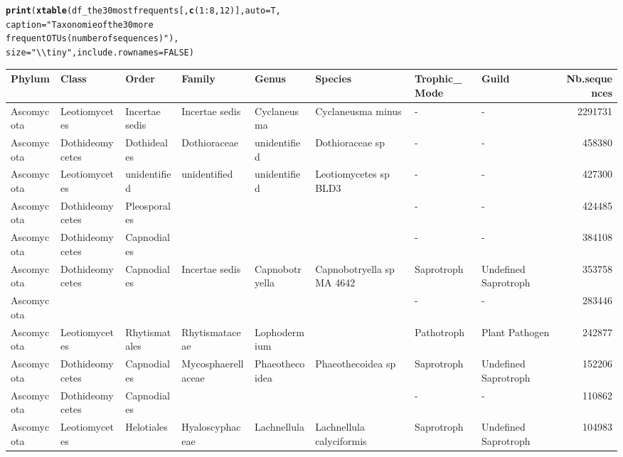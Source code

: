 \documentclass[12pt]{article}\usepackage[]{graphicx}\usepackage[]{color}
\makeatletter
\newcommand{\hlnum}[1]{\textcolor[rgb]{0.686,0.059,0.569}{#1}}%
\newcommand{\hlstr}[1]{\textcolor[rgb]{0.192,0.494,0.8}{#1}}%
\newcommand{\hlopt}[1]{\textcolor[rgb]{0,0,0}{#1}}%
\newcommand{\hlstd}[1]{\textcolor[rgb]{0.345,0.345,0.345}{#1}}%
\newcommand{\hlkwc}[1]{\textcolor[rgb]{0.333,0.667,0.333}{#1}}%
\newcommand{\hlkwd}[1]{\textcolor[rgb]{0.737,0.353,0.396}{\textbf{#1}}}%
\newenvironment{kframe}{%
 \def\at@end@of@kframe{}%
 \ifinner\ifhmode%
  \def\at@end@of@kframe{\end{minipage}}%
  \begin{minipage}{\columnwidth}%
 \fi\fi%
 \def\FrameCommand##1{\hskip\@totalleftmargin \hskip-\fboxsep
 \colorbox{shadecolor}{##1}\hskip-\fboxsep
     \hskip-\linewidth \hskip-\@totalleftmargin \hskip\columnwidth}%
 \MakeFramed {\advance\hsize-\width
   \@totalleftmargin\z@ \linewidth\hsize
   \@setminipage}}%
 {\par\unskip\endMakeFramed%
 \at@end@of@kframe}
\numberwithin{figure}{section}
\makeatother
\begin{document}
\begin{landscape}
\begin{kframe}
\begin{alltt}
\hlkwd{print}\hlstd{(}\hlkwd{xtable}\hlstd{(df_the30mostfrequents[,} \hlkwd{c}\hlstd{(}\hlnum{1}\hlopt{:}\hlnum{8}\hlstd{,} \hlnum{12}\hlstd{)],} \hlkwc{auto} \hlstd{= T,}
             \hlkwc{caption} \hlstd{=} \hlstr{"Taxonomie of the 30 more
             frequent OTUs (number of sequences)"}\hlstd{),}
      \hlkwc{size} \hlstd{=} \hlstr{"\textbackslash{}\textbackslash{}tiny"}\hlstd{,} \hlkwc{include.rownames} \hlstd{=} \hlnum{FALSE}\hlstd{)}
\end{alltt}
\end{kframe}%
\begin{table}[ht]
\centering
\begingroup\tiny
\begin{tabular}{llllllllr}
  \hline
Phylum & Class & Order & Family & Genus & Species & Trophic\_Mode & Guild & Nb.sequences \\ 
  \hline
Ascomycota & Leotiomycetes & Incertae sedis & Incertae sedis & Cyclaneusma & Cyclaneusma minus & - & - & 2291731 \\ 
  Ascomycota & Dothideomycetes & Dothideales & Dothioraceae & unidentified & Dothioraceae sp & - & - & 458380 \\ 
  Ascomycota & Leotiomycetes & unidentified & unidentified & unidentified & Leotiomycetes sp BLD3 & - & - & 427300 \\ 
  Ascomycota & Dothideomycetes & Pleosporales &  &  &  & - & - & 424485 \\ 
  Ascomycota & Dothideomycetes & Capnodiales &  &  &  & - & - & 384108 \\ 
  Ascomycota & Dothideomycetes & Capnodiales & Incertae sedis & Capnobotryella & Capnobotryella sp MA 4642 & Saprotroph & Undefined Saprotroph & 353758 \\ 
  Ascomycota &  &  &  &  &  & - & - & 283446 \\ 
  Ascomycota & Leotiomycetes & Rhytismatales & Rhytismataceae & Lophodermium &  & Pathotroph & Plant Pathogen & 242877 \\ 
  Ascomycota & Dothideomycetes & Capnodiales & Mycosphaerellaceae & Phaeothecoidea & Phaeothecoidea sp & Saprotroph & Undefined Saprotroph & 152206 \\ 
  Ascomycota & Dothideomycetes & Capnodiales &  &  &  & - & - & 110862 \\ 
  Ascomycota & Leotiomycetes & Helotiales & Hyaloscyphaceae & Lachnellula & Lachnellula calyciformis & Saprotroph & Undefined Saprotroph & 104983 \\ 

\end{tabular}
\end{table}
\end{landscape}
\end{document}
